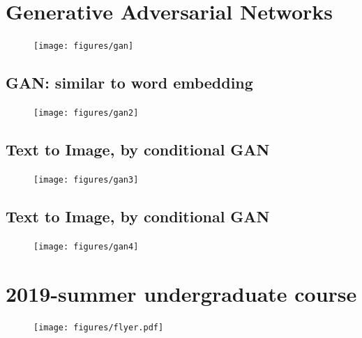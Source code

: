\section{Generative Adversarial Networks}
\begin{figure}[H]
\centering
\texttt{[image: figures/gan]}
\end{figure}



\subsection{GAN: similar to word embedding }
\begin{figure}[H]
\centering
\texttt{[image: figures/gan2]}
\end{figure}



\subsection{Text to Image, by conditional GAN}
\begin{figure}[H]
\centering
\texttt{[image: figures/gan3]}
\end{figure}



\subsection{Text to Image, by conditional GAN}
\begin{figure}[H]
\centering
\texttt{[image: figures/gan4]}
\end{figure}



\section{2019-summer undergraduate course}
\begin{figure}[H]
\centering
\texttt{[image: figures/flyer.pdf]}
\end{figure}

